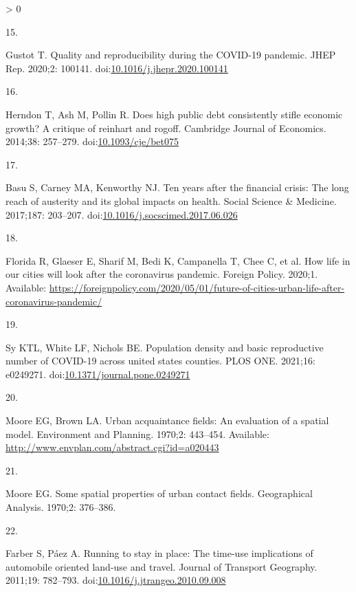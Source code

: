 \documentclass[10pt,letterpaper]{article}
\newlength{\csllabelwidth}
\newlength{\cslhangindent}
\newenvironment{CSLReferences}[3] %
 {%
  \setlength{\parindent}{0pt}
  \ifodd #1 \everypar{\setlength{\hangindent}{\cslhangindent}}\ignorespaces\fi
  \ifnum #2 > 0
  \setlength{\parskip}{#2\baselineskip}
  \fi
 }%
 {}
\newcommand{\CSLLeftMargin}[1]{\parbox[t]{\csllabelwidth}{#1}}
\newcommand{\CSLRightInline}[1]{\parbox[t]{\linewidth - \csllabelwidth}{#1}}
\begin{document}
\begin{CSLReferences}{0}{0}
\leavevmode\hypertarget{ref-Gustot2020quality}{}%
\CSLLeftMargin{15. }
\CSLRightInline{Gustot T. Quality and reproducibility during the
COVID-19 pandemic. JHEP Rep. 2020;2: 100141.
doi:\href{https://doi.org/10.1016/j.jhepr.2020.100141}{10.1016/j.jhepr.2020.100141}}

\leavevmode\hypertarget{ref-Herndon2014high}{}%
\CSLLeftMargin{16. }
\CSLRightInline{Herndon T, Ash M, Pollin R. Does high public debt
consistently stifle economic growth? A critique of reinhart and rogoff.
Cambridge Journal of Economics. 2014;38: 257--279.
doi:\href{https://doi.org/10.1093/cje/bet075}{10.1093/cje/bet075}}

\leavevmode\hypertarget{ref-Basu2017ten}{}%
\CSLLeftMargin{17. }
\CSLRightInline{Basu S, Carney MA, Kenworthy NJ. Ten years after the
financial crisis: The long reach of austerity and its global impacts on
health. Social Science \& Medicine. 2017;187: 203--207.
doi:\href{https://doi.org/10.1016/j.socscimed.2017.06.026}{10.1016/j.socscimed.2017.06.026}}

\leavevmode\hypertarget{ref-Florida2020how}{}%
\CSLLeftMargin{18. }
\CSLRightInline{Florida R, Glaeser E, Sharif M, Bedi K, Campanella T,
Chee C, et al. How life in our cities will look after the coronavirus
pandemic. Foreign Policy. 2020;1. Available:
\url{https://foreignpolicy.com/2020/05/01/future-of-cities-urban-life-after-coronavirus-pandemic/}}

\leavevmode\hypertarget{ref-Sy2021population}{}%
\CSLLeftMargin{19. }
\CSLRightInline{Sy KTL, White LF, Nichols BE. Population density and
basic reproductive number of COVID-19 across united states counties.
PLOS ONE. 2021;16: e0249271.
doi:\href{https://doi.org/10.1371/journal.pone.0249271}{10.1371/journal.pone.0249271}}

\leavevmode\hypertarget{ref-Moore1970urban}{}%
\CSLLeftMargin{20. }
\CSLRightInline{Moore EG, Brown LA. Urban acquaintance fields: An
evaluation of a spatial model. Environment and Planning. 1970;2:
443--454. Available:
\url{http://www.envplan.com/abstract.cgi?id=a020443}}

\leavevmode\hypertarget{ref-Moore1970some}{}%
\CSLLeftMargin{21. }
\CSLRightInline{Moore EG. Some spatial properties of urban contact
fields. Geographical Analysis. 1970;2: 376--386. }

\leavevmode\hypertarget{ref-Farber2011running}{}%
\CSLLeftMargin{22. }
\CSLRightInline{Farber S, Páez A. Running to stay in place: The time-use
implications of automobile oriented land-use and travel. Journal of
Transport Geography. 2011;19: 782--793.
doi:\href{https://doi.org/10.1016/j.jtrangeo.2010.09.008}{10.1016/j.jtrangeo.2010.09.008}}


\end{CSLReferences}
\end{document}
